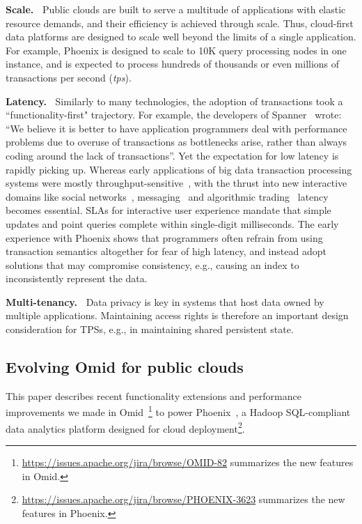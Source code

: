 {\bf Scale.\ } 
Public clouds  are built to  serve a multitude of applications 
with elastic resource demands, and their efficiency is achieved through  scale. 
Thus, cloud-first data platforms are  designed to scale well beyond the limits of a single application. 
For example, Phoenix is designed to scale to 10K query processing 
nodes in one instance, and is expected to   process hundreds
 of thousands or even millions of transactions per second ({\em tps}). 
 
{\bf Latency.\ }
Similarly to many technologies, the adoption of transactions took a  ``functionality-first" trajectory. 
For example, the developers of Spanner~\cite{Spanner2012} wrote: 
  ``We believe it
is better to have application programmers deal with performance problems due to overuse 
of transactions as bottlenecks arise, rather than always coding around the lack of transactions''. 
Yet the expectation for low latency is rapidly picking up. 
Whereas early applications of big data transaction processing systems were 
mostly throughput-sensitive~\cite{Percolator2010, Omid2017}, 
with the thrust into new interactive domains like social networks~\cite{chatter},  
messaging~\cite{Borthakur:2011} and algorithmic trading~\cite{opentsdb} latency becomes essential.  
SLAs for interactive user experience mandate that simple updates and point queries  complete within 
single-digit milliseconds. The early experience with Phoenix shows that programmers  often
refrain from using transaction semantics altogether for fear of high latency, 
and instead  adopt solutions that may compromise consistency, e.g., 
causing an index to inconsistently represent the data.

{\bf Multi-tenancy.\ } Data privacy is key in systems that host data owned by multiple applications.
Maintaining  access rights is therefore an important design consideration for TPSs, 
e.g., in maintaining shared persistent state. 

\subsection{Evolving Omid for public clouds}

This paper describes recent functionality extensions and performance improvements 
we made in Omid~\cite{omid}\footnote{\small{\url{https://issues.apache.org/jira/browse/OMID-82} summarizes 
the new features in Omid.}} to power 
Phoenix~\cite{phoenix},  a Hadoop SQL-compliant  data analytics platform designed 
for cloud deployment\footnote{\small{\url{https://issues.apache.org/jira/browse/PHOENIX-3623}
summarizes the new features in Phoenix.}}. 

